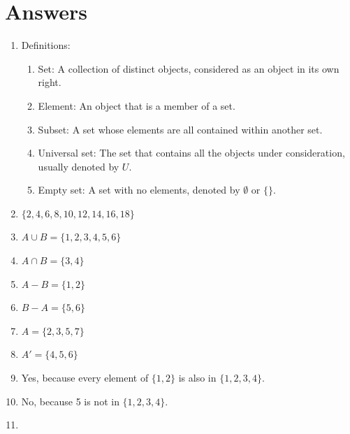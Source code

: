\documentclass[12pt]{article}
\begin{document}
\newpage

\section*{Answers}

\begin{enumerate}
    \item Definitions:
    \begin{enumerate}
        \item Set: A collection of distinct objects, considered as an object in its own right.
        \item Element: An object that is a member of a set.
        \item Subset: A set whose elements are all contained within another set.
        \item Universal set: The set that contains all the objects under consideration, usually denoted by \( U \).
        \item Empty set: A set with no elements, denoted by \( \emptyset \) or \( \{\} \).
    \end{enumerate}
    
    \item \(\{2, 4, 6, 8, 10, 12, 14, 16, 18\}\)

    \item \( A \cup B = \{1, 2, 3, 4, 5, 6\} \)

    \item \( A \cap B = \{3, 4\} \)

    \item \( A - B = \{1, 2\} \)

    \item \( B - A = \{5, 6\} \)

    \item \( A = \{2, 3, 5, 7\} \)

    \item \( A' = \{4, 5, 6\} \)

    \item Yes, because every element of \(\{1, 2\}\) is also in \(\{1, 2, 3, 4\}\).

    \item No, because 5 is not in \(\{1, 2, 3, 4\}\).

    \item \begin{center}
    \end{center}


\end{enumerate}
\end{document}

